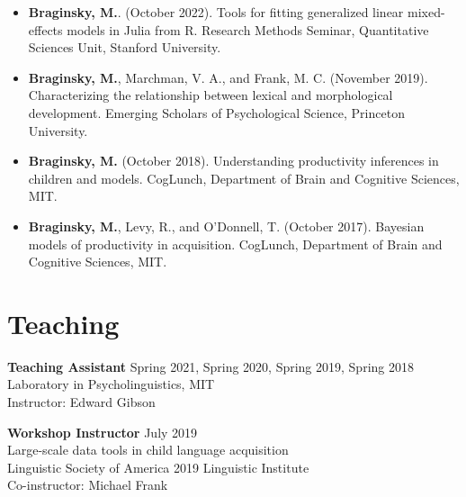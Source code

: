 \documentclass[11pt,]{article}
\begin{document}
\begin{itemize}
\item
  \textbf{Braginsky, M.}. (October 2022). Tools for fitting generalized
  linear mixed-effects models in Julia from R. Research Methods Seminar,
  Quantitative Sciences Unit, Stanford University.
\item
  \textbf{Braginsky, M.}, Marchman, V. A., and Frank, M. C. (November
  2019). Characterizing the relationship between lexical and
  morphological development. Emerging Scholars of Psychological Science,
  Princeton University.
\item
  \textbf{Braginsky, M.} (October 2018). Understanding productivity
  inferences in children and models. CogLunch, Department of Brain and
  Cognitive Sciences, MIT.
\item
  \textbf{Braginsky, M.}, Levy, R., and O'Donnell, T. (October 2017).
  Bayesian models of productivity in acquisition. CogLunch, Department
  of Brain and Cognitive Sciences, MIT.
\end{itemize}

\hypertarget{teaching}{%
\section{Teaching}\label{teaching}}

\textbf{Teaching Assistant} \hfill Spring 2021, Spring 2020, Spring
2019, Spring 2018\\
\hspace*{0.333em}\hspace*{0.333em}\hspace*{0.333em}\hspace*{0.333em}Laboratory
in Psycholinguistics, MIT\\
\hspace*{0.333em}\hspace*{0.333em}\hspace*{0.333em}\hspace*{0.333em}Instructor:
Edward Gibson

\textbf{Workshop Instructor} \hfill July 2019\\
\hspace*{0.333em}\hspace*{0.333em}\hspace*{0.333em}\hspace*{0.333em}Large-scale
data tools in child language acquisition\\
\hspace*{0.333em}\hspace*{0.333em}\hspace*{0.333em}\hspace*{0.333em}Linguistic
Society of America 2019 Linguistic Institute\\
\hspace*{0.333em}\hspace*{0.333em}\hspace*{0.333em}\hspace*{0.333em}Co-instructor:
Michael Frank
\end{document}
